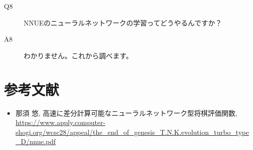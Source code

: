 \documentclass[11pt,a4paper]{ltjsarticle}
\begin{document}
\begin{description}
  \item[Q8] NNUEのニューラルネットワークの学習ってどうやるんですか？
  \item[A8] わかりません。これから調べます。
\end{description}


\section{参考文献}

\begin{itemize}
  \item 那須 悠, 高速に差分計算可能なニューラルネットワーク型将棋評価関数, \url{https://www.apply.computer-shogi.org/wcsc28/appeal/the_end_of_genesis_T.N.K.evolution_turbo_type_D/nnue.pdf}
\end{itemize}
\end{document}

